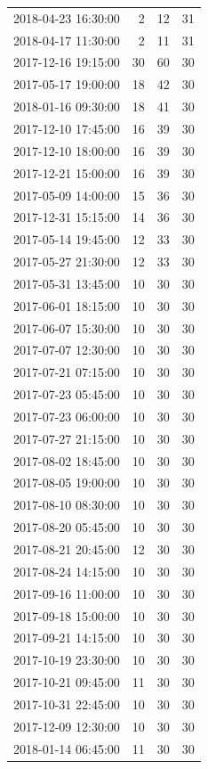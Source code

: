 \begin{tabular}{lrrr}
2018-04-23 16:30:00 & 2 & 12 & 31 \\
2018-04-17 11:30:00 & 2 & 11 & 31 \\
2017-12-16 19:15:00 & 30 & 60 & 30 \\
2017-05-17 19:00:00 & 18 & 42 & 30 \\
2018-01-16 09:30:00 & 18 & 41 & 30 \\
2017-12-10 17:45:00 & 16 & 39 & 30 \\
2017-12-10 18:00:00 & 16 & 39 & 30 \\
2017-12-21 15:00:00 & 16 & 39 & 30 \\
2017-05-09 14:00:00 & 15 & 36 & 30 \\
2017-12-31 15:15:00 & 14 & 36 & 30 \\
2017-05-14 19:45:00 & 12 & 33 & 30 \\
2017-05-27 21:30:00 & 12 & 33 & 30 \\
2017-05-31 13:45:00 & 10 & 30 & 30 \\
2017-06-01 18:15:00 & 10 & 30 & 30 \\
2017-06-07 15:30:00 & 10 & 30 & 30 \\
2017-07-07 12:30:00 & 10 & 30 & 30 \\
2017-07-21 07:15:00 & 10 & 30 & 30 \\
2017-07-23 05:45:00 & 10 & 30 & 30 \\
2017-07-23 06:00:00 & 10 & 30 & 30 \\
2017-07-27 21:15:00 & 10 & 30 & 30 \\
2017-08-02 18:45:00 & 10 & 30 & 30 \\
2017-08-05 19:00:00 & 10 & 30 & 30 \\
2017-08-10 08:30:00 & 10 & 30 & 30 \\
2017-08-20 05:45:00 & 10 & 30 & 30 \\
2017-08-21 20:45:00 & 12 & 30 & 30 \\
2017-08-24 14:15:00 & 10 & 30 & 30 \\
2017-09-16 11:00:00 & 10 & 30 & 30 \\
2017-09-18 15:00:00 & 10 & 30 & 30 \\
2017-09-21 14:15:00 & 10 & 30 & 30 \\
2017-10-19 23:30:00 & 10 & 30 & 30 \\
2017-10-21 09:45:00 & 11 & 30 & 30 \\
2017-10-31 22:45:00 & 10 & 30 & 30 \\
2017-12-09 12:30:00 & 10 & 30 & 30 \\
2018-01-14 06:45:00 & 11 & 30 & 30 \\

\end{tabular}

